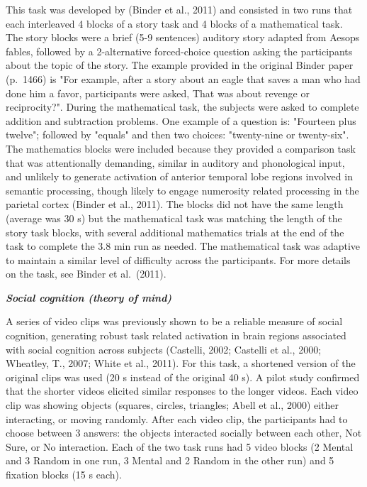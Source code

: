 \documentclass[11pt]{article}
\begin{document}
This task was developed by (Binder et al., 2011) and consisted in two
runs that each interleaved 4 blocks of a story task and 4 blocks of a
mathematical task. The story blocks were a brief (5-9 sentences)
auditory story adapted from Aesop\textquotesingle s fables, followed by
a 2-alternative forced-choice question asking the participants about the
topic of the story. The example provided in the original Binder paper
(p.~1466) is "For example, after a story about an eagle that saves a man
who had done him a favor, participants were asked, \textquotesingle That
was about revenge or reciprocity?\textquotesingle". During the
mathematical task, the subjects were asked to complete addition and
subtraction problems. One example of a question is: "Fourteen plus
twelve"; followed by "equals" and then two choices: "twenty-nine or
twenty-six". The mathematics blocks were included because they provided
a comparison task that was attentionally demanding, similar in auditory
and phonological input, and unlikely to generate activation of anterior
temporal lobe regions involved in semantic processing, though likely to
engage numerosity related processing in the parietal cortex (Binder et
al., 2011). The blocks did not have the same length (average was 30 s)
but the mathematical task was matching the length of the story task
blocks, with several additional mathematics trials at the end of the
task to complete the 3.8 min run as needed. The mathematical task was
adaptive to maintain a similar level of difficulty across the
participants. For more details on the task, see Binder et al.~(2011).

\textbf{\emph{Social cognition (theory of mind)}}

A series of video clips was previously shown to be a reliable measure of
social cognition, generating robust task related activation in brain
regions associated with social cognition across subjects (Castelli,
2002; Castelli et al., 2000; Wheatley, T., 2007; White et al., 2011).
For this task, a shortened version of the original clips was used (20 s
instead of the original 40 s). A pilot study confirmed that the shorter
videos elicited similar responses to the longer videos. Each video clip
was showing objects (squares, circles, triangles; Abell et al., 2000)
either interacting, or moving randomly. After each video clip, the
participants had to choose between 3 answers: \textquotesingle the
objects interacted socially between each other\textquotesingle,
\textquotesingle Not Sure\textquotesingle, or \textquotesingle No
interaction\textquotesingle. Each of the two task runs had 5 video
blocks (2 Mental and 3 Random in one run, 3 Mental and 2 Random in the
other run) and 5 fixation blocks (15 s each).
\end{document}
